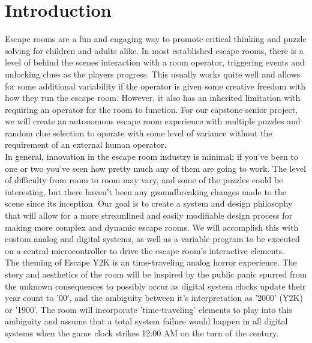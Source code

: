 \documentclass[conference]{IEEEtran}
\begin{document}
\section{Introduction}
Escape rooms are a fun and engaging way to promote critical thinking and puzzle solving for children and adults
alike. In most established escape rooms, there is a level of behind the scenes interaction with a room operator,
triggering events and unlocking clues as the players progress. This usually works quite well and allows for some
additional variability if the operator is given some creative freedom with how they run the escape room. However,
it also has an inherited limitation with requiring an operator for the room to function. For our capstone senior
project, we will create an autonomous escape room experience with multiple puzzles and random clue selection to
operate with some level of variance without the requirement of an external human operator.
\\
\indent In general, innovation in the escape room industry is minimal; if you've been to one or two you've seen how
pretty much any of them are going to work. The level of difficulty from room to room may vary, and some of the
puzzles could be interesting, but there haven't been any groundbreaking changes made to the scene since its inception.
Our goal is to create a system and design philosophy that will allow for a more streamlined and easily modifiable
design process for making more complex and dynamic escape rooms. We will accomplish this with custom analog and digital
systems, as well as a variable program to be executed on a central microcontroller to drive the escape room's
interactive elements.
\\
\indent The theming of Escape Y2K is an time-traveling analog horror experience. The story and aesthetics of the room
will be inspired by the public panic spurred from the unknown consequences to possibly occur as digital system
clocks update their year count to '00', and the ambiguity between it's interpretation as '2000' (Y2K) or '1900'.
The room will incorporate 'time-traveling' elements to play into this ambiguity and assume that a total system
failure would happen in all digital systems when the game clock strikes 12:00 AM on the turn of the century.
\end{document}
